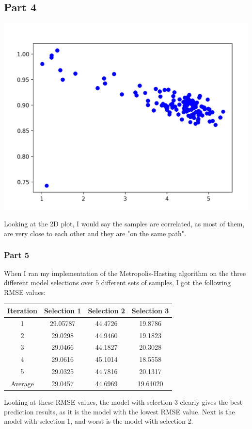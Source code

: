 \documentclass{report}
\begin{document}
\subsection*{Part 4}
\begin{center}
    \includegraphics[height = 7 cm]{5_4.png}
\end{center}
Looking at the 2D plot, I would say the samples are correlated, as most of them, are very close to each other and they are "on the same path".

\subsubsection*{Part 5}
When I ran my implementation of the Metropolis-Hasting algorithm on the three different model selections over 5 different sets of samples, I got the following RMSE values:
\begin{center}
    \begin{tabular}{|c|c|c|c|}
        \hline
        Iteration & Selection 1 & Selection 2 & Selection 3 \\
        \hline
        1 & 29.05787 & 44.4726 & 19.8786 \\
        \hline
        2 & 29.0298 & 44.9460 & 19.1823 \\
        \hline
        3 & 29.0466 & 44.1827 & 20.3028 \\
        \hline
        4 & 29.0616 & 45.1014 & 18.5558 \\
        \hline
        5 & 29.0325 & 44.7816 & 20.1317 \\
        \hline
        Average & 29.0457 & 44.6969 & 19.61020 \\
        \hline
    \end{tabular}
\end{center}
Looking at these RMSE values, the model with selection 3 clearly gives the best prediction results, as it is the model with the lowest RMSE value. Next is the model with selection 1, and worst is the model with selection 2. \\
\end{document}
